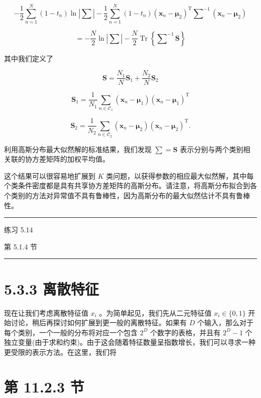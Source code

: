 \documentclass[10pt]{report}
\newcommand{\HRule}{\begin{center}\rule{0.9\linewidth}{0.2mm}\end{center}}
\begin{document}
\[
- \frac{1}{2}\mathop{\sum }\limits_{{n = 1}}^{N}\left( {1 - {t}_{n}}\right) \ln \left| \mathbf{\sum }\right|  - \frac{1}{2}\mathop{\sum }\limits_{{n = 1}}^{N}\left( {1 - {t}_{n}}\right) {\left( {\mathbf{x}}_{n} - {\mathbf{\mu }}_{2}\right) }^{\mathrm{T}}{\mathbf{\sum }}^{-1}\left( {{\mathbf{x}}_{n} - {\mathbf{\mu }}_{2}}\right)
\]

\[
=  - \frac{N}{2}\ln \left| \mathbf{\sum }\right|  - \frac{N}{2}\operatorname{Tr}\left\{  {{\mathbf{\sum }}^{-1}\mathbf{S}}\right\}   \tag{5.60}
\]

其中我们定义了

\[
\mathbf{S} = \frac{{N}_{1}}{N}{\mathbf{S}}_{1} + \frac{{N}_{2}}{N}{\mathbf{S}}_{2} \tag{5.61}
\]

\[
{\mathbf{S}}_{1} = \frac{1}{{N}_{1}}\mathop{\sum }\limits_{{n \in  {\mathcal{C}}_{1}}}\left( {{\mathbf{x}}_{n} - {\mathbf{\mu }}_{1}}\right) {\left( {\mathbf{x}}_{n} - {\mathbf{\mu }}_{1}\right) }^{\mathrm{T}} \tag{5.62}
\]

\[
{\mathbf{S}}_{2} = \frac{1}{{N}_{2}}\mathop{\sum }\limits_{{n \in  {\mathcal{C}}_{2}}}\left( {{\mathbf{x}}_{n} - {\mathbf{\mu }}_{2}}\right) {\left( {\mathbf{x}}_{n} - {\mathbf{\mu }}_{2}\right) }^{\mathrm{T}}. \tag{5.63}
\]

利用高斯分布最大似然解的标准结果，我们发现 \(\mathbf{\sum } = \mathbf{S}\) 表示分别与两个类别相关联的协方差矩阵的加权平均值。

这个结果可以很容易地扩展到 \(K\) 类问题，以获得参数的相应最大似然解，其中每个类条件密度都是具有共享协方差矩阵的高斯分布。请注意，将高斯分布拟合到各个类别的方法对异常值不具有鲁棒性，因为高斯分布的最大似然估计不具有鲁棒性。

\HRule

练习 5.14

第 5.1.4 节

\HRule

\section*{5.3.3 离散特征}

现在让我们考虑离散特征值 \({x}_{i}\) 。为简单起见，我们先从二元特征值 \({x}_{i} \in  \{ 0,1\}\) 开始讨论，稍后再探讨如何扩展到更一般的离散特征。如果有 \(D\) 个输入，那么对于每个类别，一个一般的分布将对应一个包含 \({2}^{D}\) 个数字的表格，并且有 \({2}^{D} - 1\) 个独立变量(由于求和约束)。由于这会随着特征数量呈指数增长，我们可以寻求一种更受限的表示方法。在这里，我们将

\section*{第 11.2.3 节}
\end{document}
